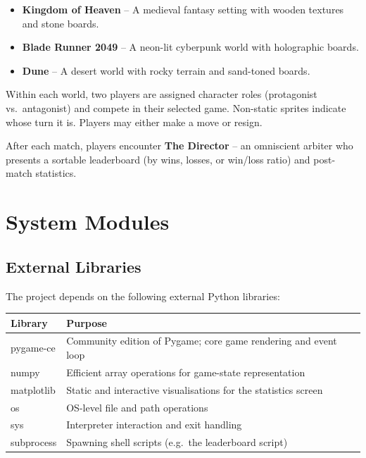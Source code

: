\documentclass[12pt, a4paper]{article}
\begin{document}
\begin{itemize}
    \item \textbf{Kingdom of Heaven} -- A medieval fantasy setting with wooden textures and stone boards.
    \item \textbf{Blade Runner 2049} -- A neon-lit cyberpunk world with holographic boards.
    \item \textbf{Dune} -- A desert world with rocky terrain and sand-toned boards.
\end{itemize}

Within each world, two players are assigned character roles (protagonist vs.\ antagonist) and compete in their selected game. Non-static sprites indicate whose turn it is. Players may either make a move or resign.

After each match, players encounter \textbf{The Director} -- an omniscient arbiter who presents a sortable leaderboard (by wins, losses, or win/loss ratio) and post-match statistics.

\section{System Modules}

\subsection{External Libraries}

The project depends on the following external Python libraries:

\begin{center}
\begin{tabular}{| >{\ttfamily}l | p{9cm} |}
\hline
\normalfont\textbf{Library} & \textbf{Purpose} \\
\hline
pygame-ce \normalfont\cite{pygamece}   & Community edition of Pygame; core game rendering and event loop \\
numpy \normalfont\cite{numpy}          & Efficient array operations for game-state representation \\
matplotlib \normalfont\cite{matplotlib}& Static and interactive visualisations for the statistics screen \\
os                                     & OS-level file and path operations \\
sys                                    & Interpreter interaction and exit handling \\
subprocess                             & Spawning shell scripts (e.g.\ the leaderboard script) \\
\hline
\end{tabular}
\end{center}
\end{document}
